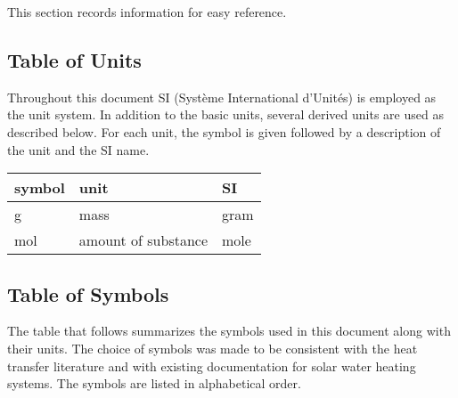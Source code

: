 \documentclass[12pt]{article}
\begin{document}
This section records information for easy reference.
 
\subsection{Table of Units} \label{sec_ToU}

Throughout this document SI (Syst\`{e}me International d'Unit\'{e}s) is employed
as the unit system.  In addition to the basic units, several derived units are
used as described below.  For each unit, the symbol is given followed by a
description of the unit and the SI name.
~\newline

\renewcommand{\arraystretch}{1.2}
  \noindent \begin{tabular}{l l l} 
    \toprule		
    \textbf{symbol} & \textbf{unit} & \textbf{SI}\\
    \midrule 
    \si{\gram} & mass	& gram\\
    \si{\mole} & amount of substance & mole\\
    \bottomrule
  \end{tabular}


\subsection{Table of Symbols} \label{sec_tabSymbs}

The table that follows summarizes the symbols used in this document along with
their units.  The choice of symbols was made to be consistent with the heat
transfer literature and with existing documentation for solar water heating
systems.  The symbols are listed in alphabetical order.
\end{document}
